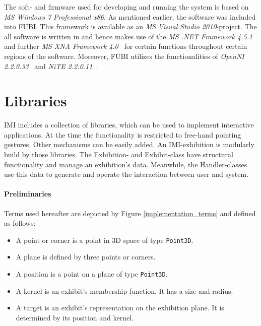 The soft- and firmware used for developing and running the system is based on \textit{\ac{MS} Windows 7 Professional x86}. As mentioned earlier, the software was included into \ac{FUBI}. This framework is available as an \textit{\ac{MS} Visual Studio 2010}-project. The all software is written in  and hence makes use of the \textit{\ac{MS} .NET Framework 4.5.1}~\cite{MSNET} and further \textit{\ac{MS} XNA Framework 4.0}~\cite{MSXNA} for certain functions throughout certain regions of the software. Moreover, \ac{FUBI} utilizes the functionalities of \textit{OpenNI 2.2.0.33}~\cite{OpenNI} and \textit{NiTE 2.2.0.11}~\cite{NiTE}. 


\section{Libraries}
\label{implementation_libraries}

\ac{IMI} includes a collection of libraries, which can be used to implement interactive applications. At the time the functionality is restricted to free-hand pointing gestures. Other mechanisms can be easily added. An \ac{IMI}-exhibition is modularly build by those libraries. The Exhibition- and Exhibit-class have structural functionality and manage an exhibition's data. Meanwhile, the Handler-classes use this data to generate and operate the interaction between user and system.

\paragraph{Preliminaries} Terms used hereafter are depicted by Figure \ref{implementation_terms} and defined as follows:
\begin{itemize}
	\item A point or corner is a point in \ac{3D} space of type \texttt{Point3D}.
	\item A plane is defined by three points or corners. 
	\item A position is a point on a plane of type \texttt{Point3D}.
	\item A kernel is an exhibit's membership function. It has a size and radius.
	\item A target is an exhibit's representation on the exhibition plane. It is determined by its position and kernel.
\end{itemize}


